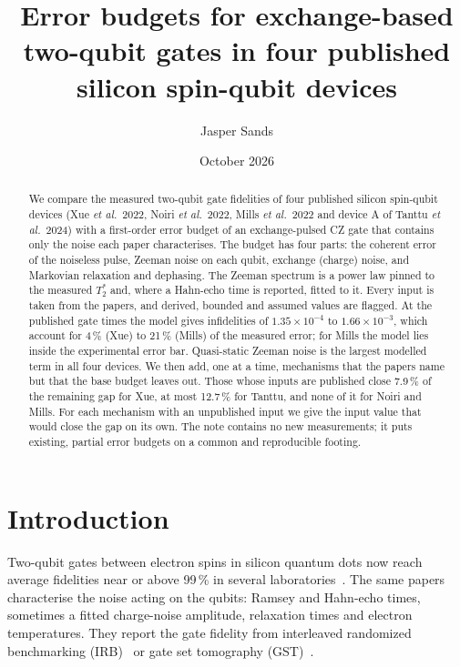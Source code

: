 \documentclass[reprint,aps,pra,floatfix,superscriptaddress,longbibliography,nofootinbib]{revtex4-2}
\newcommand{\Ts}{T_2^{*}}
\newcommand{\ee}[2]{#1\times10^{#2}}
\begin{document}
\title{Error budgets for exchange-based two-qubit gates in four published silicon spin-qubit devices}

\author{Jasper Sands}

\date{October 2026}

\begin{abstract}
We compare the measured two-qubit gate fidelities of four published silicon spin-qubit devices (Xue \emph{et al.}\ 2022, Noiri \emph{et al.}\ 2022, Mills \emph{et al.}\ 2022 and device A of Tanttu \emph{et al.}\ 2024) with a first-order error budget of an exchange-pulsed CZ gate that contains only the noise each paper characterises. The budget has four parts: the coherent error of the noiseless pulse, Zeeman noise on each qubit, exchange (charge) noise, and Markovian relaxation and dephasing. The Zeeman spectrum is a power law pinned to the measured $\Ts$ and, where a Hahn-echo time is reported, fitted to it. Every input is taken from the papers, and derived, bounded and assumed values are flagged. At the published gate times the model gives infidelities of $\ee{1.35}{-4}$ to $\ee{1.66}{-3}$, which account for 4\,\% (Xue) to 21\,\% (Mills) of the measured error; for Mills the model lies inside the experimental error bar. Quasi-static Zeeman noise is the largest modelled term in all four devices. We then add, one at a time, mechanisms that the papers name but that the base budget leaves out. Those whose inputs are published close 7.9\,\% of the remaining gap for Xue, at most 12.7\,\% for Tanttu, and none of it for Noiri and Mills. For each mechanism with an unpublished input we give the input value that would close the gap on its own. The note contains no new measurements; it puts existing, partial error budgets on a common and reproducible footing.
\end{abstract}

\maketitle

\section{Introduction}
\label{sec:intro}

Two-qubit gates between electron spins in silicon quantum dots now reach average fidelities near or above 99\,\% in several laboratories~\cite{xue2022,noiri2022,mills2022,tanttu2024}. The same papers characterise the noise acting on the qubits: Ramsey and Hahn-echo times, sometimes a fitted charge-noise amplitude, relaxation times and electron temperatures. They report the gate fidelity from interleaved randomized benchmarking (IRB)~\cite{magesan2011,magesan2012} or gate set tomography (GST)~\cite{blumekohout2017,nielsen2021}.
\end{document}
